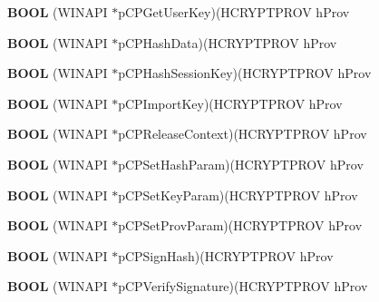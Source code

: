 \begin{DoxyCompactItemize}
{\bfseries B\+O\+OL} (W\+I\+N\+A\+PI $\ast$p\+C\+P\+Get\+User\+Key)(H\+C\+R\+Y\+P\+T\+P\+R\+OV h\+Prov
\item 
\mbox{\label{structtag_p_r_o_v_f_u_n_c_s_a913af71329dc5ef9379d4c3e727342fc}} 
{\bfseries B\+O\+OL} (W\+I\+N\+A\+PI $\ast$p\+C\+P\+Hash\+Data)(H\+C\+R\+Y\+P\+T\+P\+R\+OV h\+Prov
\item 
\mbox{\label{structtag_p_r_o_v_f_u_n_c_s_ab90bf442cc88ab18d8ee95c286c5159d}} 
{\bfseries B\+O\+OL} (W\+I\+N\+A\+PI $\ast$p\+C\+P\+Hash\+Session\+Key)(H\+C\+R\+Y\+P\+T\+P\+R\+OV h\+Prov
\item 
\mbox{\label{structtag_p_r_o_v_f_u_n_c_s_a04883ee27122d47e26821aff10710225}} 
{\bfseries B\+O\+OL} (W\+I\+N\+A\+PI $\ast$p\+C\+P\+Import\+Key)(H\+C\+R\+Y\+P\+T\+P\+R\+OV h\+Prov
\item 
\mbox{\label{structtag_p_r_o_v_f_u_n_c_s_a4f896fecbcf2ae4eb5fea18b817cedc7}} 
{\bfseries B\+O\+OL} (W\+I\+N\+A\+PI $\ast$p\+C\+P\+Release\+Context)(H\+C\+R\+Y\+P\+T\+P\+R\+OV h\+Prov
\item 
\mbox{\label{structtag_p_r_o_v_f_u_n_c_s_a29920d047d380e18279173ebc5685f06}} 
{\bfseries B\+O\+OL} (W\+I\+N\+A\+PI $\ast$p\+C\+P\+Set\+Hash\+Param)(H\+C\+R\+Y\+P\+T\+P\+R\+OV h\+Prov
\item 
\mbox{\label{structtag_p_r_o_v_f_u_n_c_s_a82301cd9f844fe5fbdbd3102ab51a4e3}} 
{\bfseries B\+O\+OL} (W\+I\+N\+A\+PI $\ast$p\+C\+P\+Set\+Key\+Param)(H\+C\+R\+Y\+P\+T\+P\+R\+OV h\+Prov
\item 
\mbox{\label{structtag_p_r_o_v_f_u_n_c_s_a43a49973c75aa97cd54b2dbc08c6bd22}} 
{\bfseries B\+O\+OL} (W\+I\+N\+A\+PI $\ast$p\+C\+P\+Set\+Prov\+Param)(H\+C\+R\+Y\+P\+T\+P\+R\+OV h\+Prov
\item 
\mbox{\label{structtag_p_r_o_v_f_u_n_c_s_a8029b54e56b1dd9e8f4c5caa9adbff9e}} 
{\bfseries B\+O\+OL} (W\+I\+N\+A\+PI $\ast$p\+C\+P\+Sign\+Hash)(H\+C\+R\+Y\+P\+T\+P\+R\+OV h\+Prov
\item 
\mbox{\label{structtag_p_r_o_v_f_u_n_c_s_a33b8ddf720a6042b268566191048bf24}} 
{\bfseries B\+O\+OL} (W\+I\+N\+A\+PI $\ast$p\+C\+P\+Verify\+Signature)(H\+C\+R\+Y\+P\+T\+P\+R\+OV h\+Prov
\end{DoxyCompactItemize}
